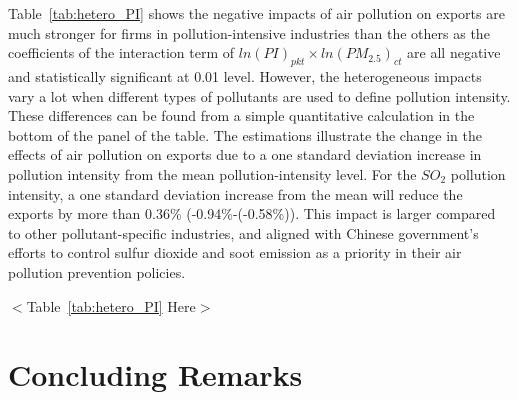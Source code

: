\documentclass[12pt]{article}
\begin{document}
  Table~\ref{tab:hetero_PI} shows the negative impacts of air pollution
  on exports are much stronger for firms in pollution-intensive industries than the
  others as the coefficients of the interaction term of $ln(PI)_{pkt}\times ln(PM_{2.5})_{ct}$ 
  are all negative and statistically significant at 0.01 level. However, the heterogeneous impacts vary a 
  lot when different types of pollutants are used to define pollution intensity. These differences can be found from a simple quantitative calculation in the bottom of the panel of the table. The estimations
  illustrate the change in the effects of air pollution on exports due to a one standard deviation increase in pollution intensity from the mean pollution-intensity level. For the $SO_{2}$ pollution intensity, a one standard deviation increase from the mean will reduce the exports by more than 0.36\% (-0.94\%-(-0.58\%)). This impact is larger compared to other pollutant-specific industries, and aligned with Chinese government's efforts to control sulfur dioxide and soot emission as a priority in their air pollution prevention policies.
  

  \begin{center}
    $<$Table~\ref{tab:hetero_PI} Here$>$
    \end{center}


\section{Concluding Remarks}
\end{document}
